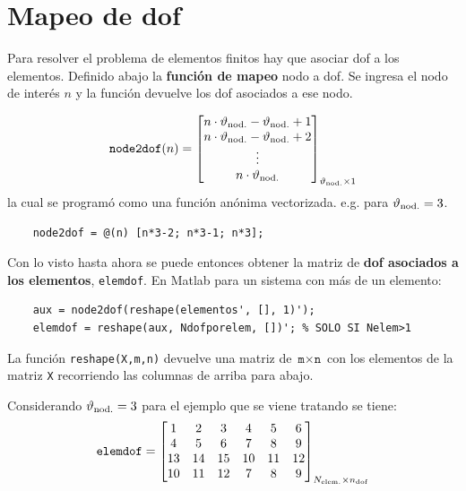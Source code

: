 \documentclass[11pt, a4paper,titlepage]{article}
\newcommand{\rmfont}[1]{{\fontfamily{ptm}\selectfont%
#1}}
\newcommand{\Matlab}{\rmfont{\sc Matlab}}
\begin{document}
\section{Mapeo de dof} \label{sec:dofmapping}

Para resolver el problema de elementos finitos hay que asociar dof a los elementos. Definido abajo la \textbf{función de mapeo} nodo a dof. Se ingresa el nodo de interés $n$ y la función devuelve los dof asociados a ese nodo.

\begin{equation}
	\texttt{node2dof}(n) = \begin{bmatrix}
	n\cdot\vartheta_{\mathrm{nod.}}-\vartheta_{\mathrm{nod.}} +1 \\ n\cdot\vartheta_{\mathrm{nod.}}-\vartheta_{\mathrm{nod.}} +2 \\ \vdots \\ n\cdot\vartheta_{\mathrm{nod.}}
	\end{bmatrix}_{\vartheta_{\mathrm{nod.}}\times 1}
\end{equation}
la cual se programó como una función anónima vectorizada. e.g. para $\vartheta_{\mathrm{nod.}}=3$.

\begin{verbatim}
    node2dof = @(n) [n*3-2; n*3-1; n*3];
\end{verbatim}

Con lo visto hasta ahora se puede entonces obtener la matriz de \textbf{dof asociados a los elementos}, \texttt{elemdof}. En \Matlab{} para un sistema con más de un elemento:
\begin{verbatim}
    aux = node2dof(reshape(elementos', [], 1)');
    elemdof = reshape(aux, Ndofporelem, [])'; % SOLO SI Nelem>1
\end{verbatim}

La función \texttt{reshape(X,m,n)} devuelve una matriz de $\texttt{m}\times\texttt{n}$ con los elementos de la matriz \texttt{X} recorriendo las columnas de arriba para abajo.

Considerando $\vartheta_{\mathrm{nod.}}=3$ para el ejemplo que se viene tratando se tiene:
\begin{equation} \label{eq:MatrizElemdofEjemplo}
\texttt{elemdof} = \begin{bmatrix}
1 & 2 & 3 & 4 & 5 & 6 \\
4 & 5 & 6 & 7 & 8 & 9  \\
13 & 14 & 15 & 10 & 11 & 12 \\
10 & 11 & 12 & 7 & 8 & 9 
\end{bmatrix}_{ N_{\mathrm{elem.}} \times n_{\mathrm{dof}} } 
\end{equation}
\end{document}
